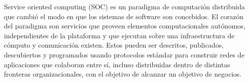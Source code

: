 Service oriented computing (SOC) es un paradigma de computación distribuida que cambió el modo en que los sistemas de software son concebidos. El corazón del paradigma son servicios que proveen elementos computacionales autónomos, independientes de la plataforma y que ejecutan sobre una infraestructura de cómputo y comunicación existen. Estos pueden ser descritos, publicados, descubiertos y programados usando protocolos estándar para construir redes de aplicaciones que colaboran entre sí, incluso distribuidas dentro de distintas fronteras organizacionales, con el objetivo de alcanzar un objetivo de negocios.


